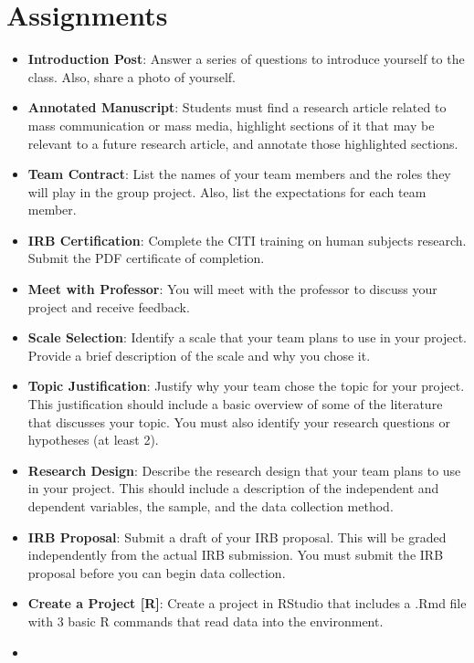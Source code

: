\documentclass[
]{book}
\providecommand{\tightlist}{%
  \setlength{\itemsep}{0pt}\setlength{\parskip}{0pt}}
\begin{document}
\section*{Assignments}\label{assignments}

\begin{itemize}
\tightlist
\item
  \textbf{Introduction Post}: Answer a series of questions to introduce yourself to the class. Also, share a photo of yourself.
\item
  \textbf{Annotated Manuscript}: Students must find a research article related to mass communication or mass media, highlight sections of it that may be relevant to a future research article, and annotate those highlighted sections.
\item
  \textbf{Team Contract}: List the names of your team members and the roles they will play in the group project. Also, list the expectations for each team member.
\item
  \textbf{IRB Certification}: Complete the CITI training on human subjects research. Submit the PDF certificate of completion.
\item
  \textbf{Meet with Professor}: You will meet with the professor to discuss your project and receive feedback.
\item
  \textbf{Scale Selection}: Identify a scale that your team plans to use in your project. Provide a brief description of the scale and why you chose it.
\item
  \textbf{Topic Justification}: Justify why your team chose the topic for your project. This justification should include a basic overview of some of the literature that discusses your topic. You must also identify your research questions or hypotheses (at least 2).
\item
  \textbf{Research Design}: Describe the research design that your team plans to use in your project. This should include a description of the independent and dependent variables, the sample, and the data collection method.
\item
  \textbf{IRB Proposal}: Submit a draft of your IRB proposal. This will be graded independently from the actual IRB submission. You must submit the IRB proposal before you can begin data collection.
\item
  \textbf{Create a Project {[}R{]}}: Create a project in RStudio that includes a .Rmd file with 3 basic R commands that read data into the environment.
\item

\end{itemize}
\end{document}
